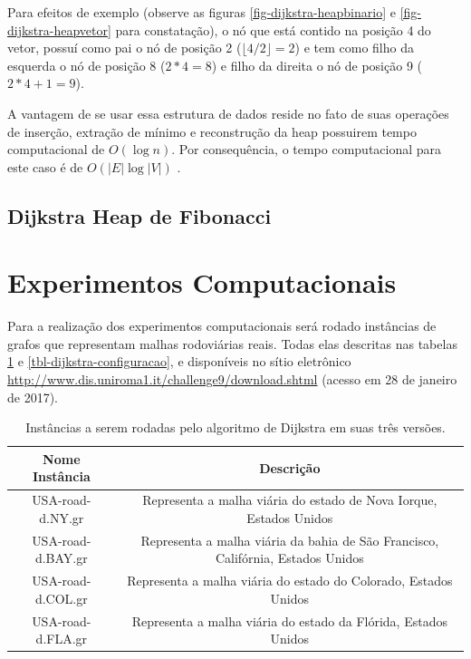  Para efeitos de exemplo (observe as figuras \ref{fig-dijkstra-heapbinario} e \ref{fig-dijkstra-heapvetor} para constatação), o nó que está contido na posição 4 do vetor, possuí como pai o nó de posição 2 ($\lfloor 4 / 2 \rfloor = 2$) e tem como filho da esquerda o nó de posição 8 ($2*4 = 8$) e filho da direita o nó de posição 9 ($2*4+1 = 9$).


A vantagem de se usar essa estrutura de dados reside no fato de suas operações de inserção, extração de mínimo e reconstrução da heap possuirem tempo computacional de $O(\log n)$. Por consequência, o tempo computacional para este caso é de $O(|E| \log |V|)$ \cite{cormen2009introduction}.

\subsection{Dijkstra Heap de Fibonacci}
\label{sec-dijkstra-versoes-fibonacci}


\section{Experimentos Computacionais}
\label{sec-dijkstra-experimentos}
Para a realização dos experimentos computacionais será rodado instâncias de grafos que representam malhas rodoviárias reais. Todas elas descritas nas tabelas \ref{tbl-dijkstra-instancias} e \ref{tbl-dijkstra-configuracao}, e disponíveis no sítio eletrônico \url{http://www.dis.uniroma1.it/challenge9/download.shtml} (acesso em 28 de janeiro de 2017).
\begin{table}[H]
\caption{Instâncias a serem rodadas pelo algoritmo de Dijkstra em suas três versões.}
\label{tbl-dijkstra-instancias}
\centering
\begin{adjustbox}{max width=\textwidth}
\begin{tabular}{|c|c|}
\hline 
\textbf{Nome Instância} & \textbf{Descrição} \\ 
\hline 
USA-road-d.NY.gr & Representa a malha viária do estado de Nova Iorque, Estados Unidos \\ 
\hline 
USA-road-d.BAY.gr & Representa a malha viária da bahia de São Francisco, Califórnia, Estados Unidos \\ 
\hline 
USA-road-d.COL.gr & Representa a malha viária do estado do Colorado, Estados Unidos \\ 
\hline 
USA-road-d.FLA.gr & Representa a malha viária do estado da Flórida, Estados Unidos \\ 
\hline 
\end{tabular}
\end{adjustbox}
\end{table}


